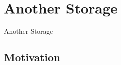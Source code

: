 \documentclass[aspectratio=43]{beamer}
\begin{document}
\section{Another Storage}

{
\begin{frame}{Another Storage}
\end{frame}
}

\subsection{Motivation}
\end{document}
